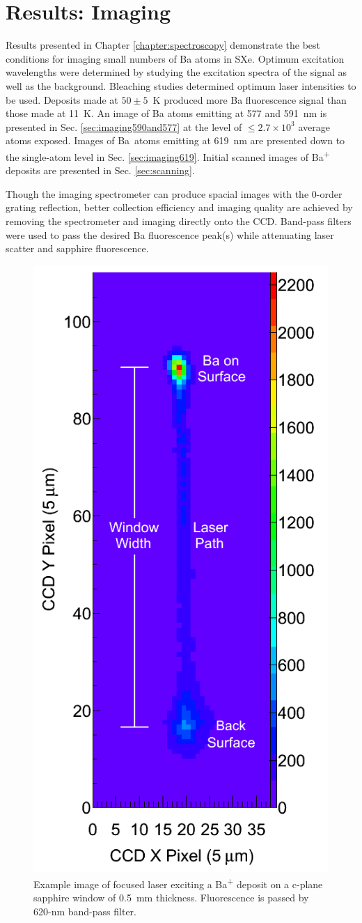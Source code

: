 \chapter{Results: Imaging}
\label{chapter:imaging}


Results presented in Chapter \ref{chapter:spectroscopy} demonstrate the best conditions for imaging small numbers of Ba atoms in SXe.  Optimum excitation wavelengths were determined by studying the excitation spectra of the signal as well as the background.  Bleaching studies determined optimum laser intensities to be used.  Deposits made at $50 \pm 5$~K produced more Ba fluorescence signal than those made at 11~K.  An image of Ba atoms emitting at 577 and 591~nm is presented in Sec. \ref{sec:imaging590and577} at the level of $\leq 2.7 \times 10^{3}$ average atoms exposed. Images of Ba\ atoms emitting at 619~nm are presented down to the single-atom level in Sec. \ref{sec:imaging619}.  Initial scanned images of Ba\textsuperscript{+} deposits are presented in Sec. \ref{sec:scanning}.

Though the imaging spectrometer can produce spacial images with the 0-order grating reflection, better collection efficiency and imaging quality are achieved by removing the spectrometer and imaging directly onto the CCD.  Band-pass filters were used to pass the desired Ba fluorescence peak(s) while attenuating laser scatter and sapphire fluorescence.

\begin{figure} %
        \centering
                \includegraphics[width=.4\textwidth]{figures/imageExamp.png}
                \caption{Example image of focused laser exciting a Ba\textsuperscript{+} deposit on a c-plane sapphire window of 0.5~mm thickness.  Fluorescence is passed by 620-nm band-pass filter.}
\label{fig:imageexamp}
\end{figure}

